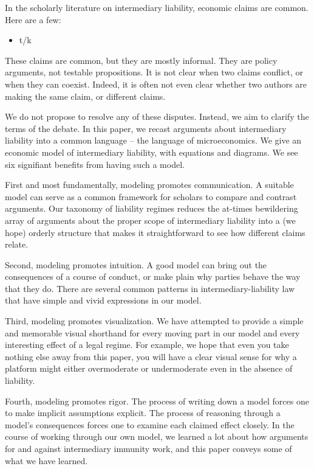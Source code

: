In the scholarly literature on intermediary liability, economic claims are common. Here are a few:

\begin{itemize}
\item t/k
\end{itemize}

These claims are common, but they are mostly informal. They are policy arguments, not testable propositions. It is not clear when two claims conflict, or when they can coexist. Indeed, it is often not even clear whether two authors are making the same claim, or different claims.

We do not propose to resolve any of these disputes. Instead, we aim to clarify the terms of the debate. In this paper, we recast arguments about intermediary liability into a common language -- the language of microeconomics. We give an economic model of intermediary liability, with equations and diagrams. We see six signifiant benefits from having such a model.

First and most fundamentally, modeling promotes communication. A suitable model can serve as a common framework for scholars to compare and contrast arguments. Our taxonomy of liability regimes reduces the at-times bewildering array of arguments about the proper scope of intermediary liability into a (we hope) orderly structure that makes it straightforward to see how different claims relate.

Second, modeling promotes intuition. A good model can bring out the consequences of a course of conduct, or make plain why parties behave the way that they do. There are several common patterns in intermediary-liability law that have simple and vivid expressions in our model.

Third, modeling promotes visualization. We have attempted to provide a simple and memorable visual shorthand for every moving part in our model and every interesting effect of a legal regime. For example, we hope that even you take nothing else away from this paper, you will have a clear visual sense for why a platform might either overmoderate or undermoderate even in the absence of liability.

Fourth, modeling promotes rigor. The process of writing down a model forces one to make implicit assumptions explicit. The process of reasoning through a model's consequences forces one to examine each claimed effect closely. In the course of working through our own model, we learned a lot about how arguments for and against intermediary immunity work, and this paper conveys some of what we have learned.

